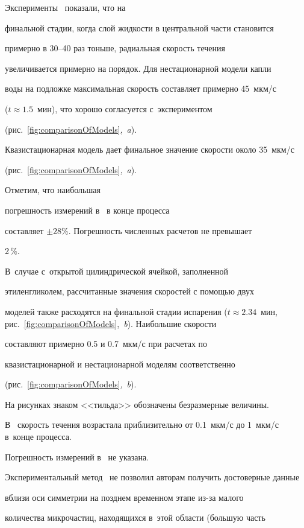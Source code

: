 Эксперименты~\cite{Rieger,PhysRevE.83.051602} показали, что на

финальной стадии, когда слой жидкости в центральной части становится

примерно в 30--40 раз тоньше, радиальная скорость течения

увеличивается примерно на порядок. Для нестационарной модели капли

воды на подложке максимальная скорость составляет примерно 45~мкм/с

($t\approx 1.5$~мин), что хорошо согласуется с~экспериментом~\cite{PhysRevE.83.051602}

(рис.~\ref{fig:comparisonOfModels},~{\sl a}\/). 

Квазистационарная модель дает финальное значение скорости около 35~мкм/с

(рис.~\ref{fig:comparisonOfModels},~{\sl a}\/). 

Отметим, что наибольшая

погрешность измерений в~\cite{PhysRevE.83.051602} в конце процесса

составляет $\pm 28$\%. Погрешность численных расчетов не превышает

2\,\%. 

В~случае с~открытой цилиндрической ячейкой, заполненной

этиленгликолем, рассчитанные значения скоростей с помощью двух

моделей также расходятся на финальной стадии испарения ($t\approx

2.34$~мин, рис.~\ref{fig:comparisonOfModels},~{\sl b}\/). Наибольшие скорости

составляют примерно 0.5 и 0.7~мкм/с при расчетах по

квазистационарной и нестационарной моделям соответственно

(рис.~\ref{fig:comparisonOfModels},~{\sl b}\/). 

На рисунках знаком <<тильда>> обозначены безразмерные величины. 

В~\cite{Rieger} скорость течения возрастала приблизительно от 0.1~мкм/с до 1~мкм/с в~конце процесса.

Погрешность измерений в~\cite{Rieger} не указана. 

Экспериментальный метод~\cite{Rieger} не позволил авторам получить достоверные данные

вблизи оси симметрии на позднем временном этапе из-за малого

количества микрочастиц, находящихся в~этой области (большую часть

